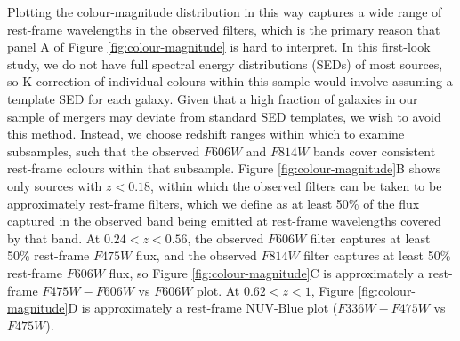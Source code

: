 {Plotting the colour-magnitude distribution in this way captures a wide range of rest-frame wavelengths in the observed filters, which is the primary reason that panel A of Figure \ref{fig:colour-magnitude} is hard to interpret. In this first-look study, we do not have full spectral energy distributions (SEDs) of most sources, so K-correction of individual colours within this sample would involve assuming a template SED for each galaxy. Given that a high fraction of galaxies in our sample of mergers may deviate from standard SED templates, we wish to avoid this method. Instead, we choose redshift ranges within which to examine subsamples, such that the observed $F606W$ and $F814W$ bands cover consistent rest-frame colours within that subsample. Figure \ref{fig:colour-magnitude}B shows only sources with $z < 0.18$, within which the observed filters can be taken to be approximately rest-frame filters, which we define as at least 50\% of the flux captured in the observed band being emitted at rest-frame wavelengths covered by that band. At $0.24 < z < 0.56$, the observed $F606W$ filter captures at least 50\% rest-frame $F475W$ flux, and the observed $F814W$ filter captures at least 50\% rest-frame $F606W$ flux, so Figure \ref{fig:colour-magnitude}C is approximately a rest-frame $F475W - F606W$ vs $F606W$ plot. At $0.62 < z < 1$, Figure \ref{fig:colour-magnitude}D is approximately a rest-frame NUV-Blue plot ($F336W - F475W$ vs $F475W$). 

}
